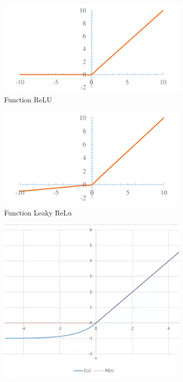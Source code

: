 \begin{figure}
{\begin{varwidth}{\textwidth}
        \begin{subfigure}[h]{0.45\textwidth} 
            \includegraphics[width=\textwidth]{imagenes/Cap4/relu}
            \caption{Function ReLU}
            \label{fig:relu}
        \end{subfigure}       
        \begin{subfigure}[h]{0.45\textwidth} 
            \includegraphics[width=\textwidth]{imagenes/Cap4/l_relu}
            \caption{Function Leaky ReLu}
            \label{fig:l_relu}
        \end{subfigure}
        \begin{subfigure}[h]{0.45\textwidth} 
            \includegraphics[width=\textwidth]{imagenes/Cap4/elu}

\end{subfigure}
\end{varwidth}}
\end{figure}
